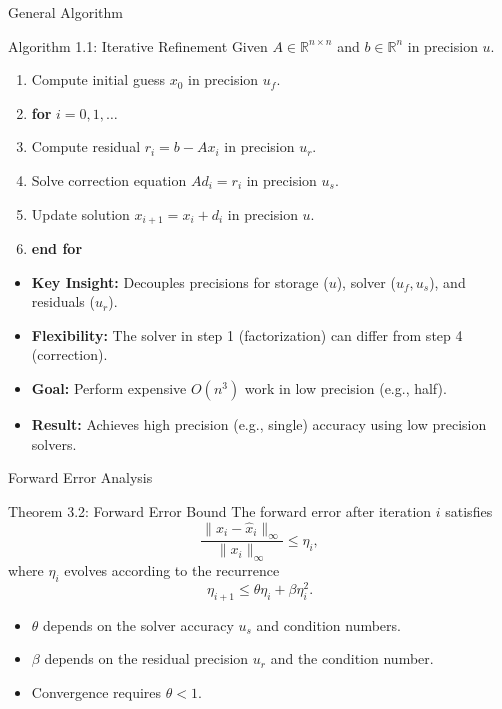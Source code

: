 \documentclass[
	11pt,
	aspectratio=169,
]{beamer}
\begin{document}
\begin{frame}{General Algorithm}
    \begin{block}{Algorithm 1.1: Iterative Refinement}
Given $A \in \mathbb{R}^{n \times n}$ and $b \in \mathbb{R}^{n}$ in precision $u$.
\begin{enumerate}
    \item Compute initial guess $x_0$ in precision $u_f$.
    \item \textbf{for} $i = 0, 1, \dots$
    \item Compute residual $r_i = b - A x_i$ in precision $u_r$.
    \item Solve correction equation $A d_i = r_i$ in precision $u_s$.
    \item Update solution $x_{i+1} = x_i + d_i$ in precision $u$.
    \item \textbf{end for}
\end{enumerate}
\end{block}

\begin{itemize}
    \item \textbf{Key Insight:} Decouples precisions for storage ($u$), solver ($u_f, u_s$), and residuals ($u_r$).
    \item \textbf{Flexibility:} The solver in step 1 (factorization) can differ from step 4 (correction).
    \item \textbf{Goal:} Perform expensive $O(n^3)$ work in low precision (e.g., half).
    \item \textbf{Result:} Achieves high precision (e.g., single) accuracy using low precision solvers.
\end{itemize}
\end{frame}
\begin{frame}{Forward Error Analysis}
    \begin{block}{Theorem 3.2: Forward Error Bound}
The forward error after iteration $i$ satisfies
\begin{equation*}
\frac{\|x_i - \widehat{x}_i\|_\infty}{\|x_i\|_\infty} \leq \eta_i,
\end{equation*}
where $\eta_i$ evolves according to the recurrence
\begin{equation*}
\eta_{i+1} \leq \theta \eta_i + \beta \eta_i^2.
\end{equation*}
\end{block}

\begin{itemize}
    \item $\theta$ depends on the solver accuracy $u_s$ and condition numbers.
    \item $\beta$ depends on the residual precision $u_r$ and the condition number.
    \item Convergence requires $\theta < 1$.
\end{itemize}
\end{frame}
\end{document}
